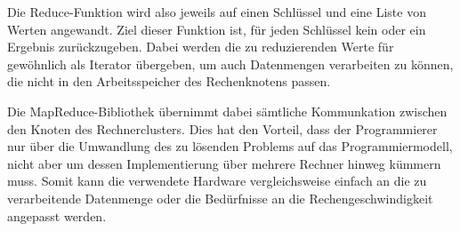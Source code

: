 Die Reduce-Funktion wird also jeweils auf einen Schlüssel und eine Liste von Werten angewandt. Ziel dieser Funktion ist, für jeden Schlüssel kein oder ein Ergebnis zurückzugeben. Dabei werden die zu reduzierenden Werte für gewöhnlich als Iterator übergeben, um auch Datenmengen verarbeiten zu können, die nicht in den Arbeitsspeicher des Rechenknotens passen.

Die MapReduce-Bibliothek übernimmt dabei sämtliche Kommunkation zwischen den Knoten des Rechnerclusters. Dies hat den Vorteil, dass der Programmierer nur über die Umwandlung des zu lösenden Problems auf das Programmiermodell, nicht aber um dessen Implementierung über mehrere Rechner hinweg kümmern muss. Somit kann die verwendete Hardware vergleichsweise einfach an die zu verarbeitende Datenmenge oder die Bedürfnisse an die Rechengeschwindigkeit angepasst werden.